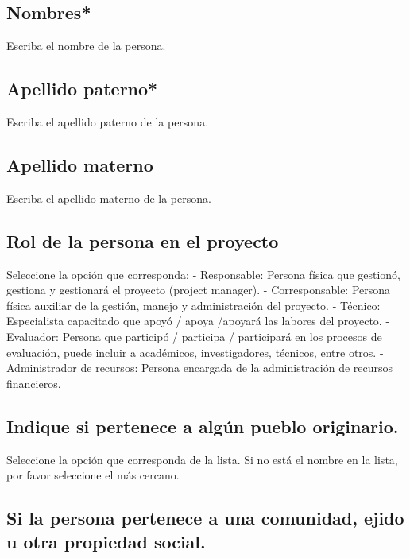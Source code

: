 \documentclass[
]{book}
\begin{document}
\hypertarget{nombres}{%
\subsection{Nombres*}\label{nombres}}

Escriba el nombre de la persona.

\hypertarget{apellido-paterno}{%
\subsection{Apellido paterno*}\label{apellido-paterno}}

Escriba el apellido paterno de la persona.

\hypertarget{apellido-materno}{%
\subsection{Apellido materno}\label{apellido-materno}}

Escriba el apellido materno de la persona.

\hypertarget{rol-de-la-persona-en-el-proyecto}{%
\subsection{Rol de la persona en el proyecto}\label{rol-de-la-persona-en-el-proyecto}}

Seleccione la opción que corresponda: - Responsable: Persona física que gestionó, gestiona y gestionará el proyecto (project manager).
- Corresponsable: Persona física auxiliar de la gestión, manejo y administración del proyecto.
- Técnico: Especialista capacitado que apoyó / apoya /apoyará las labores del proyecto.
- Evaluador: Persona que participó / participa / participará en los procesos de evaluación, puede incluir a académicos, investigadores, técnicos, entre otros.
- Administrador de recursos: Persona encargada de la administración de recursos financieros.

\hypertarget{indique-si-pertenece-a-alguxfan-pueblo-originario.}{%
\subsection{Indique si pertenece a algún pueblo originario.}\label{indique-si-pertenece-a-alguxfan-pueblo-originario.}}

Seleccione la opción que corresponda de la lista.
Si no está el nombre en la lista, por favor seleccione el más cercano.

\hypertarget{si-la-persona-pertenece-a-una-comunidad-ejido-u-otra-propiedad-social.}{%
\subsection{Si la persona pertenece a una comunidad, ejido u otra propiedad social.}\label{si-la-persona-pertenece-a-una-comunidad-ejido-u-otra-propiedad-social.}}
\end{document}
